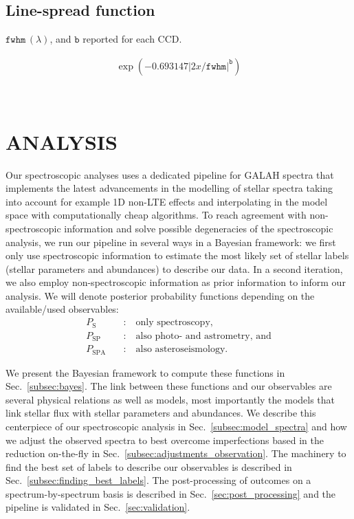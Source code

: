 \documentclass[
  journal=pasa,
  manuscript=research-paper, %
  year=2021,
  volume=37,
]{cup-journal}
\begin{document}
\subsection{Line-spread function} \label{subsec:lsf}

$\texttt{fwhm}\,(\lambda)$, and $\texttt{b}$ reported for each CCD.

\begin{align}
    \exp \left(-0.693147 \vert 2x/\texttt{fwhm}\vert^\texttt{b}\right) \label{eq:lsf}
\end{align}

\newpage $\,$
\newpage

\section{ANALYSIS}

Our spectroscopic analyses uses a dedicated pipeline for GALAH spectra that implements the latest advancements in the modelling of stellar spectra taking into account for example 1D non-LTE effects and interpolating in the model space with computationally cheap algorithms. To reach agreement with non-spectroscopic information and solve possible degeneracies of the spectroscopic analysis, we run our pipeline in several ways in a Bayesian framework: we first only use spectroscopic information to estimate the most likely set of stellar labels (stellar parameters and abundances) to describe our data. In a second iteration, we also employ non-spectroscopic information as prior information to inform our analysis. We will denote posterior probability functions depending on the available/used observables:
\begin{align}
    P_\text{S} \quad &: \quad \text{only spectroscopy,} \\
    P_\text{SP} \quad &: \quad \text{also photo- and astrometry, and} \\
    P_\text{SPA} \quad &: \quad \text{also asteroseismology.}
\end{align}

We present the Bayesian framework to compute these functions in Sec.~\ref{subsec:bayes}. The link between these functions and our observables are several physical relations as well as models, most importantly the models that link stellar flux with stellar parameters and abundances. We describe this centerpiece of our spectroscopic analysis in Sec.~\ref{subsec:model_spectra} and how we adjust the observed spectra to best overcome imperfections based in the reduction on-the-fly in Sec.~\ref{subsec:adjustments_observation}. The machinery to find the best set of labels to describe our observables is described in Sec.~\ref{subsec:finding_best_labels}. The post-processing of outcomes on a spectrum-by-spectrum basis is described in Sec.~\ref{sec:post_processing} and the pipeline is validated in Sec.~\ref{sec:validation}.
\end{document}

